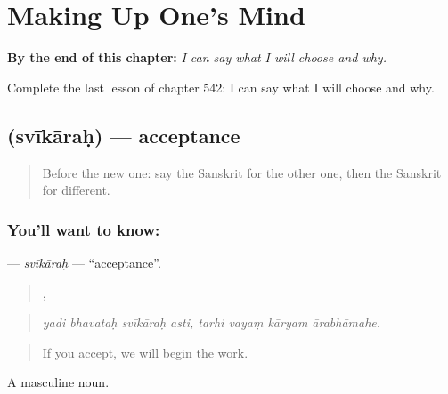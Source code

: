 
\chapter{Making Up One's Mind}
\label{ch:sa-making-up-one-s-mind}

\begin{chapteropening}
\textbf{By the end of this chapter:} \emph{I can say what I will choose and why.}

Complete the last lesson of chapter 542: I can say what I will choose and why.
\end{chapteropening}

\section[\texorpdfstring{\sk{स्वीकारः} (svīkāraḥ)}{स्वीकारः (svīkāraḥ)}]{ (svīkāraḥ) — acceptance}

\label{lesson:SA-C542-svikarah}



\begin{quote}
Before the new one: say the Sanskrit for the other one, then the Sanskrit for different.
\end{quote}

\subsection*{You'll want to know: }
\textbf{} — \emph{svīkāraḥ} — \textquotedblleft{}acceptance\textquotedblright{}.

\begin{quote}
   ,    
\end{quote}

\begin{quote}
\emph{yadi bhavataḥ svīkāraḥ asti, tarhi vayaṃ kāryam ārabhāmahe.}
\end{quote}

\begin{quote}
If you accept, we will begin the work.
\end{quote}

A masculine noun.

